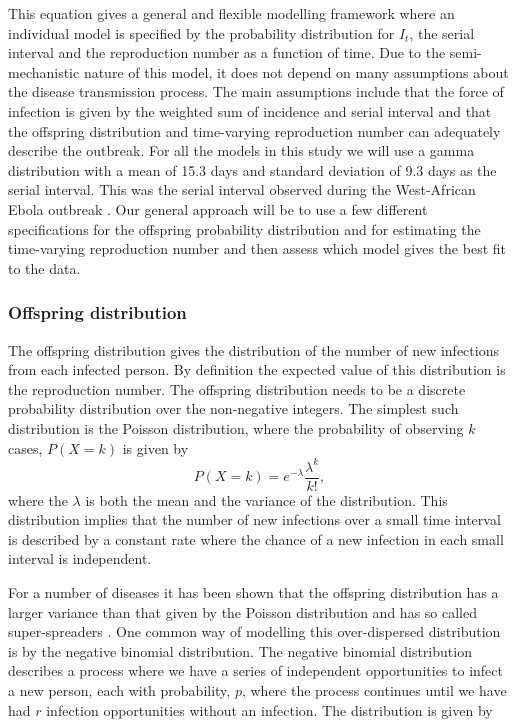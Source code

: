 \documentclass[12pt]{article}
\begin{document}
This equation gives a general and flexible modelling framework where an individual model is specified by the probability distribution for $I_t$, the serial interval and the reproduction number as a function of time. Due to the semi-mechanistic nature of this model, it does not depend on many assumptions about the disease transmission process. The main assumptions include that the force of infection is given by the weighted sum of incidence and serial interval and that the offspring distribution and time-varying reproduction number can adequately describe the outbreak. For all the models in this study we will use a gamma distribution with a mean of 15.3 days and standard deviation of 9.3 days as the serial interval. This was the serial interval observed during the West-African Ebola outbreak \cite{whoebolaresponseteamEbolaVirusDisease2014}. Our general approach will be to use a few different specifications for the offspring probability distribution and for estimating the time-varying reproduction number and then assess which model gives the best fit to the data.

\subsubsection{Offspring distribution}
The offspring distribution gives the distribution of the number of new infections from each infected person. By definition the expected value of this distribution is the reproduction number. The offspring distribution needs to be a discrete probability distribution over the non-negative integers. The simplest such distribution is the Poisson distribution, where the probability of observing $k$ cases, $P(X=k)$ is given by
\[P(X=k) = e^{-\lambda}\frac{\lambda^k}{k!}, \]
where the $\lambda$ is both the mean and the variance of the distribution. This distribution implies that the number of new infections over a small time interval is described by a constant rate where the chance of a new infection in each small interval is independent.

For a number of diseases it has been shown that the offspring distribution has a larger variance than that given by the Poisson distribution and has so called super-spreaders \cite{lloyd-smithSuperspreadingEffectIndividual2005}. One common way of modelling this over-dispersed distribution is by the negative binomial distribution. The negative binomial distribution describes a process where we have a series of independent opportunities to infect a new person, each with probability, $p$, where the process continues until we have had $r$ infection opportunities without an infection. The distribution is given by
\end{document}
